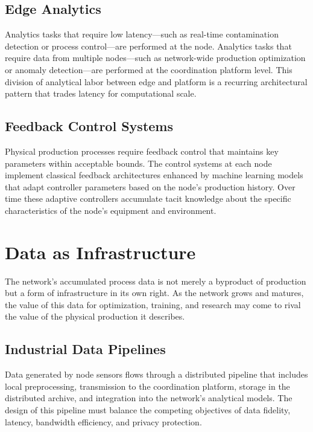 \documentclass[12pt]{book}
\theoremstyle{definition}
\theoremstyle{remark}
\begin{document}
\section{Edge Analytics}

Analytics tasks that require low latency---such as real-time
contamination detection or process control---are performed at the
node. Analytics tasks that require data from multiple nodes---such
as network-wide production optimization or anomaly detection---are
performed at the coordination platform level. This division of
analytical labor between edge and platform is a recurring
architectural pattern that trades latency for computational scale.

\section{Feedback Control Systems}

Physical production processes require feedback control that
maintains key parameters within acceptable bounds. The control
systems at each node implement classical feedback architectures
enhanced by machine learning models that adapt controller parameters
based on the node's production history. Over time these adaptive
controllers accumulate tacit knowledge about the specific
characteristics of the node's equipment and environment.

\chapter{Data as Infrastructure}

The network's accumulated process data is not merely a byproduct of
production but a form of infrastructure in its own right. As the
network grows and matures, the value of this data for optimization,
training, and research may come to rival the value of the physical
production it describes.

\section{Industrial Data Pipelines}

Data generated by node sensors flows through a distributed pipeline
that includes local preprocessing, transmission to the coordination
platform, storage in the distributed archive, and integration into
the network's analytical models. The design of this pipeline must
balance the competing objectives of data fidelity, latency,
bandwidth efficiency, and privacy protection.
\end{document}
